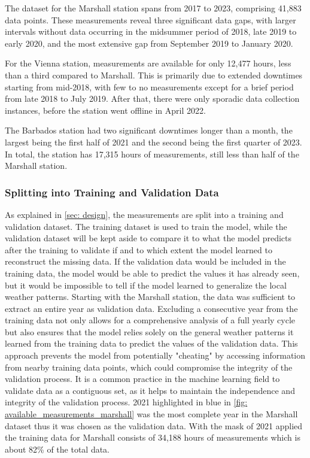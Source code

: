 The dataset for the Marshall station spans from 2017 to 2023, comprising 41,883 data points. These measurements reveal three significant data gaps, with larger intervals without data occurring in the midsummer period of 2018, late 2019 to early 2020, and the most extensive gap from September 2019 to January 2020.

For the Vienna station, measurements are available for only 12,477 hours, less than a third compared to Marshall. This is primarily due to extended downtimes starting from mid-2018, with few to no measurements except for a brief period from late 2018 to July 2019. After that, there were only sporadic data collection instances, before the station went offline in April 2022.

The Barbados station had two significant downtimes longer than a month, the largest being the first half of 2021 and the second being the first quarter of 2023. In total, the station has 17,315 hours of measurements, still less than half of the Marshall station.

\subsubsection*{Splitting into Training and Validation Data}

As explained in \autoref{sec: design}, the measurements are split into a training and validation dataset. The training dataset is used to train the model, while the validation dataset will be kept aside to compare it to what the model predicts after the training to validate if and to which extent the model learned to reconstruct the missing data. If the validation data would be included in the training data, the model would be able to predict the values it has already seen, but it would be impossible to tell if the model learned to generalize the local weather patterns.
Starting with the Marshall station, the data was sufficient to extract an entire year as validation data. Excluding a consecutive year from the training data not only allows for a comprehensive analysis of a full yearly cycle but also ensures that the model relies solely on the general weather patterns it learned from the training data to predict the values of the validation data. This approach prevents the model from potentially "cheating" by accessing information from nearby training data points, which could compromise the integrity of the validation process. It is a common practice in the machine learning field to validate data as a contiguous set, as it helps to maintain the independence and integrity of the validation process. 2021 highlighted in blue in \ref{fig: available_measurements_marshall} was the most complete year in the Marshall dataset thus it was chosen as the validation data. With the mask of 2021 applied the training data for Marshall consists of 34,188 hours of measurements which is about 82\% of the total data.

